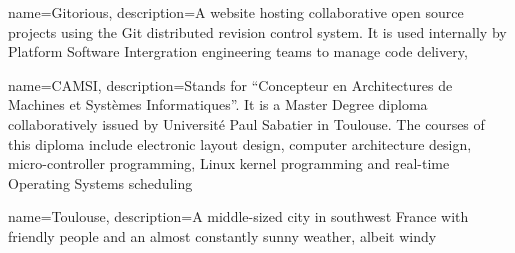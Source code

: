 {
  name=Gitorious,
  description={A website hosting collaborative open source projects
    using the Git distributed revision control system. It is used
    internally by Platform Software Intergration engineering teams to
    manage code delivery},
}




{
  name=CAMSI,
  description={Stands for ``Concepteur en Architectures de Machines et
    Systèmes Informatiques''. It is a Master Degree diploma
    collaboratively issued by Université Paul Sabatier
    in Toulouse. The courses of this diploma include
    electronic layout design, computer architecture design,
    micro-controller programming, Linux kernel programming and
    real-time Operating Systems scheduling}
}


{
  name=Toulouse,
  description={A middle-sized city in southwest France with friendly
    people and an almost constantly sunny weather, albeit windy}
}

